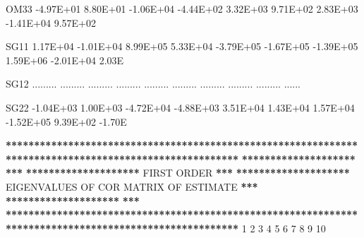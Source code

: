 \documentclass[
  11pt,
  krantz2, a4paper, twoside]{krantz}
\newenvironment{Shaded}{\begin{snugshade}}{\end{snugshade}}
\newcommand{\DecValTok}[1]{\textcolor[rgb]{0.00,0.00,0.81}{#1}}
\newcommand{\ErrorTok}[1]{\textcolor[rgb]{0.64,0.00,0.00}{\textbf{#1}}}
\newcommand{\FloatTok}[1]{\textcolor[rgb]{0.00,0.00,0.81}{#1}}
\newcommand{\NormalTok}[1]{#1}
\newcommand{\OperatorTok}[1]{\textcolor[rgb]{0.81,0.36,0.00}{\textbf{#1}}}
\newcommand{\StringTok}[1]{\textcolor[rgb]{0.31,0.60,0.02}{#1}}
\theoremstyle{definition}
\theoremstyle{definition}
\theoremstyle{definition}
\theoremstyle{remark}
\begin{document}
\begin{Shaded}
\begin{Highlighting}[]
\NormalTok{OM33   }\FloatTok{{-}4.97E+01}  \FloatTok{8.80E+01} \FloatTok{{-}1.06E+04} \FloatTok{{-}4.44E+02}  \FloatTok{3.32E+03}  \FloatTok{9.71E+02}  \FloatTok{2.83E+03} \FloatTok{{-}1.41E+04}  \FloatTok{9.57E+02}       
                                                                                                       
\NormalTok{SG11    }\FloatTok{1.17E+04} \FloatTok{{-}1.01E+04}  \FloatTok{8.99E+05}  \FloatTok{5.33E+04} \FloatTok{{-}3.79E+05} \FloatTok{{-}1.67E+05} \FloatTok{{-}1.39E+05}  \FloatTok{1.59E+06} \FloatTok{{-}2.01E+04}  \FloatTok{2.03}\NormalTok{E}
                                                                                                       
\NormalTok{SG12   ......... ......... ......... ......... ......... ......... ......... ......... ......... ......}
                                                                                                       
\NormalTok{SG22   }\FloatTok{{-}1.04E+03}  \FloatTok{1.00E+03} \FloatTok{{-}4.72E+04} \FloatTok{{-}4.88E+03}  \FloatTok{3.51E+04}  \FloatTok{1.43E+04}  \FloatTok{1.57E+04} \FloatTok{{-}1.52E+05}  \FloatTok{9.39E+02} \FloatTok{{-}1.70}\NormalTok{E}
                                                                                                       
                                                                                                       
\OperatorTok{**}\ErrorTok{*****************************************************************************************************}
\ErrorTok{********************}\StringTok{                                                                                }\ErrorTok{***}
\ErrorTok{********************}\StringTok{                                   }\NormalTok{FIRST ORDER                                  }\OperatorTok{**}\ErrorTok{*}
\ErrorTok{********************}\StringTok{                      }\NormalTok{EIGENVALUES OF COR MATRIX OF ESTIMATE                     }\OperatorTok{**}\ErrorTok{*}
\ErrorTok{********************}\StringTok{                                                                                }\ErrorTok{***}
\ErrorTok{*******************************************************************************************************}
\StringTok{                                                                                                       }
\StringTok{                                                                                                       }
\StringTok{            }\DecValTok{1}         \DecValTok{2}         \DecValTok{3}         \DecValTok{4}         \DecValTok{5}         \DecValTok{6}         \DecValTok{7}         \DecValTok{8}         \DecValTok{9}        \DecValTok{10}
                                                                                                       

\end{Highlighting}
\end{Shaded}
\end{document}
